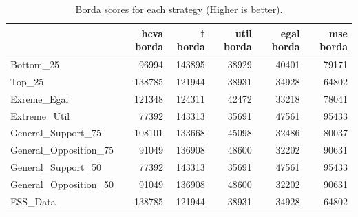 \begin{table}
\caption{Borda scores for each strategy (Higher is better).}
\begin{tabular}{lrrrrr}
\toprule
 & hcva borda & t borda & util borda & egal borda & mse borda \\
\midrule
Bottom_25 & 96994 & 143895 & 38929 & 40401 & 79171 \\
Top_25 & 138785 & 121944 & 38931 & 34928 & 64802 \\
Exreme_Egal & 121348 & 124311 & 42472 & 33218 & 78041 \\
Extreme_Util & 77392 & 143313 & 35691 & 47561 & 95433 \\
General_Support_75 & 108101 & 133668 & 45098 & 32486 & 80037 \\
General_Opposition_75 & 91049 & 136908 & 48600 & 32202 & 90631 \\
General_Support_50 & 77392 & 143313 & 35691 & 47561 & 95433 \\
General_Opposition_50 & 91049 & 136908 & 48600 & 32202 & 90631 \\
ESS_Data & 138785 & 121944 & 38931 & 34928 & 64802 \\
\bottomrule
\end{tabular}
\end{table}
